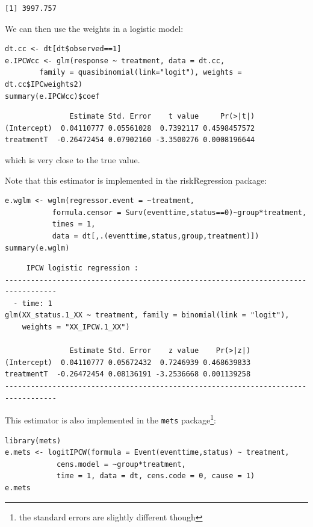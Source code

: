 \documentclass[12pt]{article}
\begin{document}
\begin{verbatim}
[1] 3997.757
\end{verbatim}


We can then use the weights in a logistic model:
\lstset{language=r,label= ,caption= ,captionpos=b,numbers=none}
\begin{lstlisting}
dt.cc <- dt[dt$observed==1]
e.IPCWcc <- glm(response ~ treatment, data = dt.cc,
		family = quasibinomial(link="logit"), weights = dt.cc$IPCweights2)
summary(e.IPCWcc)$coef
\end{lstlisting}

\begin{verbatim}
               Estimate Std. Error    t value     Pr(>|t|)
(Intercept)  0.04110777 0.05561028  0.7392117 0.4598457572
treatmentT  -0.26472454 0.07902160 -3.3500276 0.0008196644
\end{verbatim}


which is very close to the true value.

\clearpage

Note that this estimator is implemented in the riskRegression package:
\lstset{language=r,label= ,caption= ,captionpos=b,numbers=none}
\begin{lstlisting}
e.wglm <- wglm(regressor.event = ~treatment,
	       formula.censor = Surv(eventtime,status==0)~group*treatment,
	       times = 1, 
	       data = dt[,.(eventtime,status,group,treatment)])
summary(e.wglm)
\end{lstlisting}

\begin{verbatim}
     IPCW logistic regression : 
----------------------------------------------------------------------------------
  - time: 1
glm(XX_status.1_XX ~ treatment, family = binomial(link = "logit"), 
    weights = "XX_IPCW.1_XX")

               Estimate Std. Error    z value    Pr(>|z|)
(Intercept)  0.04110777 0.05672432  0.7246939 0.468639833
treatmentT  -0.26472454 0.08136191 -3.2536668 0.001139258
----------------------------------------------------------------------------------
\end{verbatim}

This estimator is also implemented in the \texttt{mets} package\footnote{the standard errors are slightly different though}:
\lstset{language=r,label= ,caption= ,captionpos=b,numbers=none}
\begin{lstlisting}
library(mets)
e.mets <- logitIPCW(formula = Event(eventtime,status) ~ treatment,
		    cens.model = ~group*treatment,
		    time = 1, data = dt, cens.code = 0, cause = 1)
e.mets
\end{lstlisting}
\end{document}
